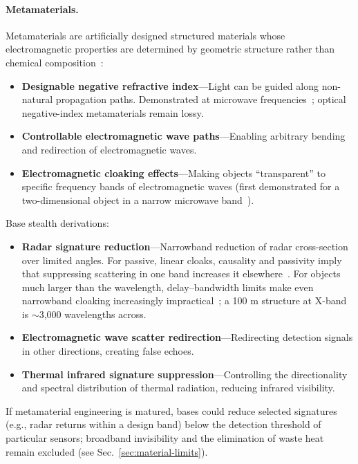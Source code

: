 \documentclass[aps,prd,twocolumn,superscriptaddress,nofootinbib]{revtex4-2}
\begin{document}
\paragraph{Metamaterials.}

Metamaterials are artificially designed structured materials whose electromagnetic properties are determined by geometric structure rather than chemical composition~\cite{Pendry2006}:

\begin{itemize}
  \item \textbf{Designable negative refractive index}---Light can be guided along non-natural propagation paths. Demonstrated at microwave frequencies~\cite{Shelby2001}; optical negative-index metamaterials remain lossy.
  \item \textbf{Controllable electromagnetic wave paths}---Enabling arbitrary bending and redirection of electromagnetic waves.
  \item \textbf{Electromagnetic cloaking effects}---Making objects ``transparent'' to specific frequency bands of electromagnetic waves (first demonstrated for a two-dimensional object in a narrow microwave band~\cite{Schurig2006}).
\end{itemize}

Base stealth derivations:

\begin{itemize}
  \item \textbf{Radar signature reduction}---Narrowband reduction of radar cross-section over limited angles. For passive, linear cloaks, causality and passivity imply that suppressing scattering in one band increases it elsewhere~\cite{Monticone2013}. For objects much larger than the wavelength, delay--bandwidth limits make even narrowband cloaking increasingly impractical~\cite{Hashemi2010}; a 100 m structure at X-band is ${\sim}$3,000 wavelengths across.
  \item \textbf{Electromagnetic wave scatter redirection}---Redirecting detection signals in other directions, creating false echoes.
  \item \textbf{Thermal infrared signature suppression}---Controlling the directionality and spectral distribution of thermal radiation, reducing infrared visibility.
\end{itemize}

If metamaterial engineering is matured, bases could reduce selected signatures (e.g., radar returns within a design band) below the detection threshold of particular sensors; broadband invisibility and the elimination of waste heat remain excluded (see Sec.~\ref{sec:material-limits}).
\end{document}

